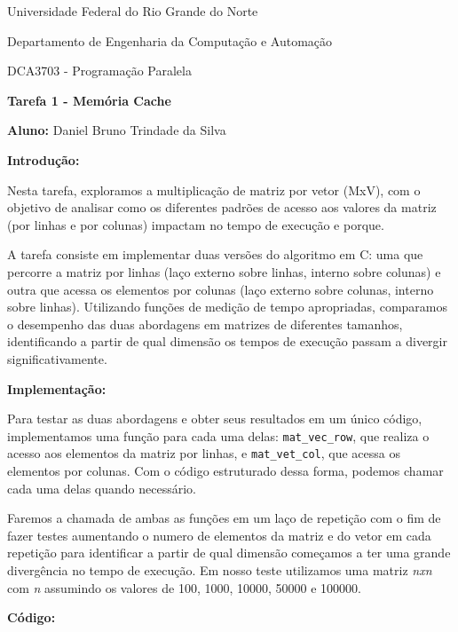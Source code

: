 \documentclass[a4paper, 12pt]{article}
\begin{document}
	\begin{center}
		Universidade Federal do Rio Grande do Norte
		
		Departamento de Engenharia da Computação e Automação
		
		DCA3703 - Programação Paralela
		
		\textbf{Tarefa 1 - Memória Cache}
		
		\textbf{Aluno:} Daniel Bruno Trindade da Silva
	\end{center}
	
	\vspace{1cm}
	
	\textbf{Introdução:}
	
	Nesta tarefa, exploramos a multiplicação de matriz por vetor (MxV), com o objetivo de analisar como os diferentes padrões de acesso aos valores da matriz (por linhas e por colunas) impactam no tempo de execução e porque.
	
	
	A tarefa consiste em implementar duas versões do algoritmo em C: uma que percorre a matriz por linhas (laço externo sobre linhas, interno sobre colunas) e outra que acessa os elementos por colunas (laço externo sobre colunas, interno sobre linhas). Utilizando funções de medição de tempo apropriadas, comparamos o desempenho das duas abordagens em matrizes de diferentes tamanhos, identificando a partir de qual dimensão os tempos de execução passam a divergir significativamente.
	
	\vspace{1cm}
	
	\textbf{Implementação:}
	
	Para testar as duas abordagens e obter seus resultados em um único código, implementamos uma função para cada uma delas: \texttt{mat\_vec\_row}, que realiza o acesso aos elementos da matriz por linhas, e \texttt{mat\_vet\_col}, que acessa os elementos por colunas. Com o código estruturado dessa forma, podemos chamar cada uma delas quando necessário.
	
	Faremos a chamada de ambas as funções em um laço de repetição com o fim de fazer testes aumentando o numero de elementos da matriz e do vetor em cada repetição para identificar a partir de qual dimensão começamos a ter uma grande divergência no tempo de execução. Em nosso teste utilizamos uma matriz \textit{nxn} com \textit{n} assumindo os valores de 100, 1000, 10000, 50000 e 100000.
	
	\vspace{1cm}
	
	\textbf{Código:}
	
\end{document}
